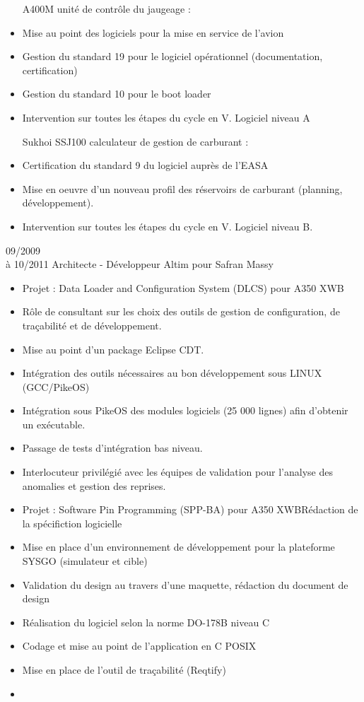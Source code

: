 \documentclass[10pt,a4paper]{moderncv}       %
\begin{document}
{
\begin{itemize}
  \item [A400M] unité de contrôle du jaugeage :
  \item Mise au point des logiciels pour la mise en service de l’avion
  \item Gestion du standard 19 pour le logiciel opérationnel (documentation, certification)
  \item Gestion du standard 10 pour le boot loader
  \item Intervention sur toutes les étapes du cycle en V. Logiciel niveau A
  \item [Sukhoi SSJ100] calculateur de gestion de carburant :
  \item Certification du standard 9 du logiciel auprès de l’EASA
  \item Mise en oeuvre d’un nouveau profil des réservoirs de carburant (planning, développement).
  \item Intervention sur toutes les étapes du cycle en V. Logiciel niveau B.
\end{itemize}
\newline{}}
\cventry
{09/2009\\à 10/2011}       %
{Architecte - Développeur} %
{Altim pour Safran}        %
{Massy}                    %
{}                         %
{
\begin{itemize}
  \item Projet : Data Loader and Configuration System (DLCS) pour A350 XWB
  \item Rôle  de consultant sur les choix des outils de gestion de configuration, de traçabilité et de développement.
  \item Mise au point d’un package Eclipse CDT.
  \item Intégration des outils nécessaires au bon développement sous LINUX (GCC/PikeOS)
  \item Intégration sous PikeOS des modules logiciels (25 000 lignes) afin d'obtenir un exécutable.
  \item Passage de tests d'intégration bas niveau.
  \item Interlocuteur privilégié avec les équipes de validation pour l'analyse des anomalies et gestion des reprises.
  \item Projet : Software Pin Programming (SPP-BA) pour A350 XWBRédaction de la
spécifiction logicielle
  \item Mise en place d'un environnement de développement pour la plateforme SYSGO (simulateur et cible)
  \item Validation du design au travers d'une maquette, rédaction du document de design
  \item Réalisation du logiciel selon la norme DO-178B niveau C
  \item Codage et mise au point de l’application en C POSIX
  \item Mise en place de l’outil de traçabilité (Reqtify)
  \item 
\end{itemize}
\newline{}}
\end{document}
